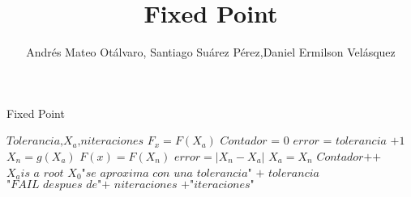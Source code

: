 \documentclass{article}
\title{Fixed Point}
\author{Andrés Mateo Otálvaro, Santiago Suárez Pérez,Daniel Ermilson Velásquez}
\begin{document}
\maketitle
\begin{algorithm}
\caption{Fixed Point}\label{numerical methods}
\begin{algorithmic}[1]
	\State $\textit{Tolerancia,$X_a$,niteraciones}$
	\State $F_x = F(X_a)$
	\State $\textit{Contador = 0}$
	\State $\textit{error = tolerancia +1} $
			\State $X_n=g(X_a)$
			\State $F(x)=F(X_n)$
			\State $\textit{error}=|X_n-X_a|$
			\State $X_a=X_n$
			\State $\textit{Contador++}$
		\EndWhile
			\State $X_a \textit{is a root}$
			\State $X_0 \textit{"se aproxima con una tolerancia" + tolerancia}$
		\Else
			\State $\textit{"FAIL despues de"+ niteraciones +"iteraciones"}$
		\EndIf
\EndProcedure
\end{algorithmic}
\end{algorithm}
\end{document}
